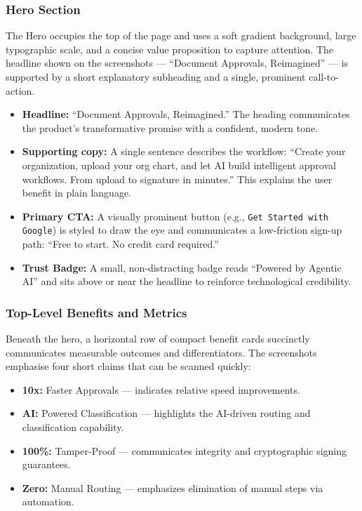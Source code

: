 \documentclass[12pt,oneside,openright,a4paper]{cpe-english-project}
\begin{document}
\subsubsection{Hero Section}
The Hero occupies the top of the page and uses a soft gradient background, large typographic scale, and a concise value proposition to capture attention. The headline shown on the screenshots — ``Document Approvals, Reimagined'' — is supported by a short explanatory subheading and a single, prominent call-to-action.

\begin{itemize}
\item \textbf{Headline:} ``Document Approvals, Reimagined.'' The heading communicates the product's transformative promise with a confident, modern tone.
\item \textbf{Supporting copy:} A single sentence describes the workflow: ``Create your organization, upload your org chart, and let AI build intelligent approval workflows. From upload to signature in minutes.'' This explains the user benefit in plain language.
\item \textbf{Primary CTA:} A visually prominent button (e.g., \texttt{Get Started with Google}) is styled to draw the eye and communicates a low-friction sign-up path: ``Free to start. No credit card required.'' 
\item \textbf{Trust Badge:} A small, non-distracting badge reads ``Powered by Agentic AI'' and sits above or near the headline to reinforce technological credibility.
\end{itemize}

\subsubsection{Top-Level Benefits and Metrics}
Beneath the hero, a horizontal row of compact benefit cards succinctly communicates measurable outcomes and differentiators. The screenshots emphasise four short claims that can be scanned quickly:

\begin{itemize}
\item \textbf{10x:} Faster Approvals — indicates relative speed improvements.
\item \textbf{AI:} Powered Classification — highlights the AI-driven routing and classification capability.
\item \textbf{100\%:} Tamper-Proof — communicates integrity and cryptographic signing guarantees.
\item \textbf{Zero:} Manual Routing — emphasizes elimination of manual steps via automation.
\end{itemize}
\end{document}
